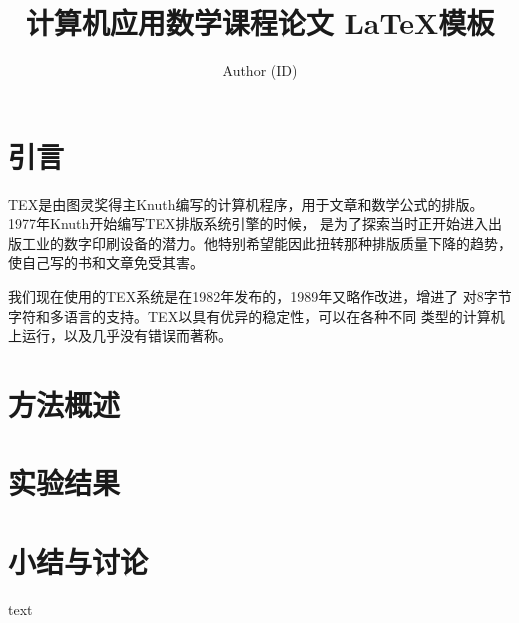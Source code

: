 \documentclass[10pt,a4paper]{article}
\theoremstyle{mythm}%
\numberwithin{equation}{section}
\begin{document}
\setlength{\abovedisplayskip}{1ex} %
\setlength{\belowdisplayskip}{1ex} %
\begin{CJK*}{UTF8}{wqyzh}

\author{Author (ID)}                                 %
\title{计算机应用数学课程论文 \LaTeX 模板}              %
\maketitle                                           %

\section{引言}
TEX是由图灵奖得主Knuth编写的计算机程序，用于文章和数学公式的排版。
1977年Knuth开始编写TEX排版系统引擎的时候，
是为了探索当时正开始进入出版工业的数字印刷设备的潜力。他特别希望能因此扭转那种排版质量下降的趋势，
使自己写的{书和文章}免受其害。

我们现在使用的TEX系统是在1982年发布的，1989年又略作改进，增进了
对8字节字符和多语言的支持。TEX以具有优异的稳定性，可以在各种不同
类型的计算机上运行，以及几乎没有错误而著称。


\section{方法概述}
%
%
%
%

\section{实验结果}

\section{小结与讨论}

\begin{thebibliography}{MM}
\addtolength{\itemsep}{-0.5em}
\begin{small}
 text
\end{small}
\end{thebibliography}
\newpage
\end{CJK*}
\end{document}
